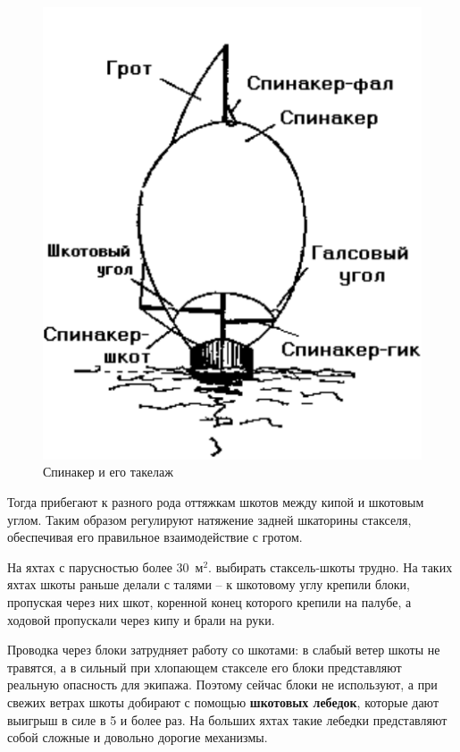 \documentclass[a4paper, 12pt, twoside, final]{scrbook}
\begin{document}
\begin{figure}%
\begin{centering}
\includegraphics{Spinaker_i_ego_takelazh}
\par\end{centering}

\caption{\label{fig:47}Спинакер и его такелаж}

\end{figure}%


Тогда прибегают к разного рода оттяжкам шкотов между кипой и шкотовым
углом. Таким образом регулируют натяжение задней шкаторины стакселя,
обеспечивая его правильное взаимодействие с гротом.

На яхтах с парусностью более 30~м$^2$. выбирать стаксель-шкоты
трудно. На таких яхтах шкоты раньше делали с талями \--- к шкотовому
углу крепили блоки, пропуская через них шкот, коренной конец которого
крепили на палубе, а ходовой пропускали через кипу и брали на руки.

Проводка через блоки затрудняет работу со шкотами: в слабый ветер
шкоты не травятся, а в сильный при хлопающем стакселе его блоки представляют
реальную опасность для экипажа. Поэтому сейчас блоки не используют,
а при свежих ветрах шкоты добирают с помощью \textbf{шкотовых лебедок},
которые дают выигрыш в силе в 5 и более раз. На больших яхтах такие
лебедки представляют собой сложные и довольно дорогие механизмы.
\end{document}
